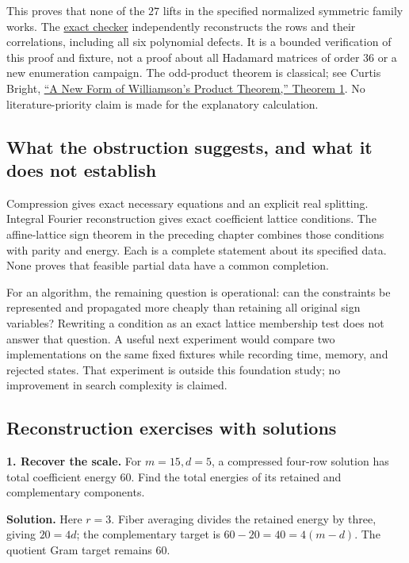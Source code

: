 \documentclass[
  11pt,
]{article}
\begin{document}
This proves that none of the \(27\) lifts in the specified normalized
symmetric family works. The \href{scripts/check_lifting.py}{exact
checker} independently reconstructs the rows and their correlations,
including all six polynomial defects. It is a bounded verification of
this proof and fixture, not a proof about all Hadamard matrices of order
\(36\) or a new enumeration campaign. The odd-product theorem is
classical; see Curtis Bright,
\href{https://arxiv.org/abs/1711.07056}{``A New Form of Williamson's
Product Theorem,'' Theorem 1}. No literature-priority claim is made for
the explanatory calculation.

\subsection{What the obstruction suggests, and what it does not
establish}\label{what-the-obstruction-suggests-and-what-it-does-not-establish}

Compression gives exact necessary equations and an explicit real
splitting. Integral Fourier reconstruction gives exact coefficient
lattice conditions. The affine-lattice sign theorem in the preceding
chapter combines those conditions with parity and energy. Each is a
complete statement about its specified data. None proves that feasible
partial data have a common completion.

For an algorithm, the remaining question is operational: can the
constraints be represented and propagated more cheaply than retaining
all original sign variables? Rewriting a condition as an exact lattice
membership test does not answer that question. A useful next experiment
would compare two implementations on the same fixed fixtures while
recording time, memory, and rejected states. That experiment is outside
this foundation study; no improvement in search complexity is claimed.

\subsection{Reconstruction exercises with
solutions}\label{reconstruction-exercises-with-solutions}

\textbf{1. Recover the scale.} For \(m=15,d=5\), a compressed four-row
solution has total coefficient energy \(60\). Find the total energies of
its retained and complementary components.

\textbf{Solution.} Here \(r=3\). Fiber averaging divides the retained
energy by three, giving \(20=4d\); the complementary target is
\(60-20=40=4(m-d)\). The quotient Gram target remains \(60\).
\end{document}
